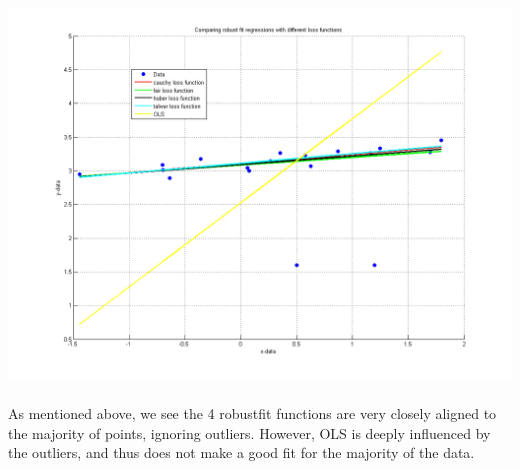 \documentclass[paper=a4, fontsize=11pt]{scrartcl} %
\numberwithin{equation}{section} %
\numberwithin{figure}{section} %
\numberwithin{table}{section} %
\begin{document}
	\hspace*{-3cm}\includegraphics[scale=0.7]{all_methods_graph}
	\\\\
	As mentioned above, we see the 4 robustfit functions are very closely aligned to the majority of points, ignoring outliers. However, OLS is deeply influenced by the outliers, and thus does not make a good fit for the majority of the data.
	
	
	\newpage
\end{document}
